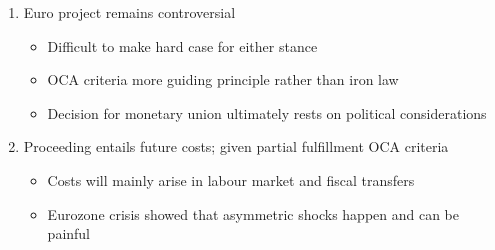 \documentclass{beamer}
\begin{document}
\begin{frame}
\begin{table}[!h] \centering \caption{Scorecard for the OCA criteria} \label{table:summary}
\end{table}
\end{frame}

\begin{frame}
  \begin{enumerate}
  \item Euro project remains controversial
  \begin{itemize}
    \item Difficult to make hard case for either stance 
    \item OCA criteria more guiding principle rather than iron law
    \item Decision for monetary union ultimately rests on political considerations
  \end{itemize}
  \medskip
  \item Proceeding entails future costs; given partial fulfillment OCA criteria  
  \begin{itemize}
    \item Costs will mainly arise in labour market and fiscal transfers
    \item Eurozone crisis showed that asymmetric shocks happen and can be painful
  \end{itemize}
\end{enumerate}
\end{frame}

\end{document}
